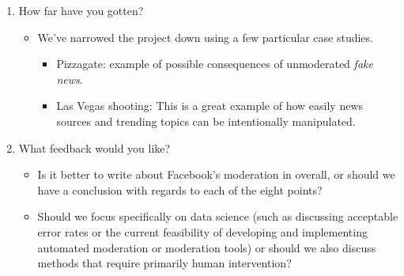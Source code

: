 \documentclass[11pt]{article}
\begin{document}
\begin{enumerate}
  \item How far have you gotten? 
    \begin{itemize}
      \item We've narrowed the project down using a few particular case studies.
        \begin{itemize}
          \item Pizzagate: example of possible consequences of unmoderated \textit{fake news}.
          \item Las Vegas shooting: This is a great example of how easily news sources and trending topics can be intentionally manipulated.
        \end{itemize}
    \end{itemize}

  \item What feedback would you like?
    \begin{itemize}
      \item Is it better to write about Facebook's moderation in overall, or should we have a conclusion with regards to each of the eight points?
      \item Should we focus specifically on data science (such as discussing acceptable error rates or the current feasibility of developing and implementing automated moderation or moderation tools) or should we also discuss methods that require primarily human intervention?
    \end{itemize}

\end{enumerate}
\end{document}
